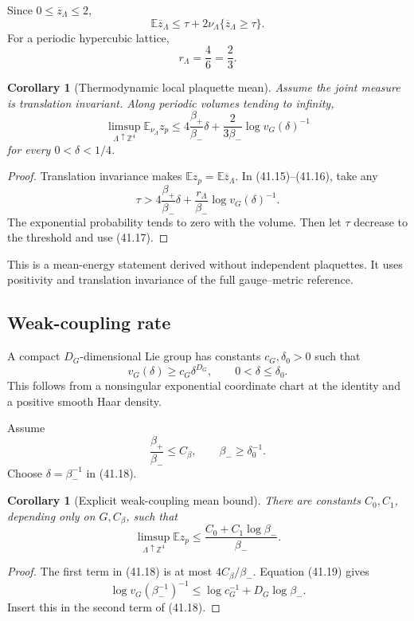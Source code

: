 \documentclass[11pt]{article}
\newtheorem{corollary}[theorem]{Corollary}
\begin{document}
Since \(0\leq\overline z_\Lambda\leq2\),
\[
 \mathbb E\overline z_\Lambda
 \leq
 \tau+
 2\nu_\Lambda\{\overline z_\Lambda\geq\tau\}.
 \tag{41.16}
\]
For a periodic hypercubic lattice,
\[
 r_\Lambda=\frac{4}{6}=\frac23.
 \tag{41.17}
\]

\begin{corollary}[Thermodynamic local plaquette mean]
\label{cor:v11v41-local-mean}
Assume the joint measure is translation invariant.  Along periodic
volumes tending to infinity,
\[
 \limsup_{\Lambda\uparrow\mathbb Z^4}
 \mathbb E_{\nu_\Lambda}z_p
 \leq
 4\frac{\beta_+}{\beta_-}\delta
 +\frac{2}{3\beta_-}\log v_G(\delta)^{-1}
 \tag{41.18}
\]
for every \(0<\delta<1/4\).
\end{corollary}

\begin{proof}
Translation invariance makes
\(\mathbb E z_p=\mathbb E\overline z_\Lambda\).
In (41.15)--(41.16), take any
\[
 \tau>
 4\frac{\beta_+}{\beta_-}\delta
 +\frac{r_\Lambda}{\beta_-}\log v_G(\delta)^{-1}.
\]
The exponential probability tends to zero with the volume.  Then let
\(\tau\) decrease to the threshold and use (41.17).
\end{proof}

This is a mean-energy statement derived without independent
plaquettes.  It uses positivity and translation invariance of the full
gauge--metric reference.

\subsection{Weak-coupling rate}

A compact \(D_G\)-dimensional Lie group has constants
\(c_G,\delta_0>0\) such that
\[
 v_G(\delta)\geq c_G\delta^{D_G},
 \qquad0<\delta\leq\delta_0.
 \tag{41.19}
\]
This follows from a nonsingular exponential coordinate chart at the
identity and a positive smooth Haar density.

Assume
\[
 \frac{\beta_+}{\beta_-}\leq C_\beta,
 \qquad
 \beta_-\geq\delta_0^{-1}.
 \tag{41.20}
\]
Choose \(\delta=\beta_-^{-1}\) in (41.18).

\begin{corollary}[Explicit weak-coupling mean bound]
\label{cor:v11v41-weak}
There are constants \(C_0,C_1\), depending only on
\(G,C_\beta\), such that
\[
 \limsup_{\Lambda\uparrow\mathbb Z^4}
 \mathbb E z_p
 \leq
 \frac{C_0+C_1\log\beta_-}{\beta_-}.
 \tag{41.21}
\]
\end{corollary}

\begin{proof}
The first term in (41.18) is at most \(4C_\beta/\beta_-\).
Equation (41.19) gives
\[
 \log v_G(\beta_-^{-1})^{-1}
 \leq
 \log c_G^{-1}+D_G\log\beta_-.
\]
Insert this in the second term of (41.18).
\end{proof}
\end{document}

